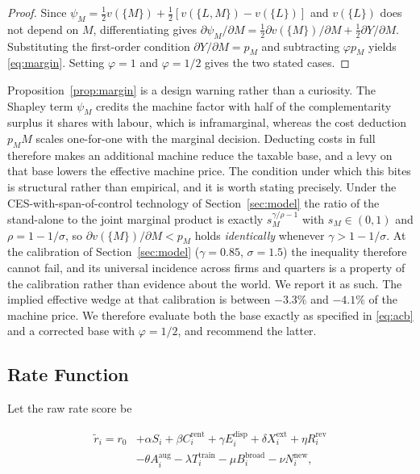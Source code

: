 \documentclass[journal]{IEEEtran}
\theoremstyle{plain}
\theoremstyle{definition}
\begin{document}
\begin{proof}
Since $\psi_M = \tfrac{1}{2}v(\{M\}) + \tfrac{1}{2}[v(\{L,M\}) - v(\{L\})]$ and $v(\{L\})$ does not depend on $M$, differentiating gives $\partial\psi_M/\partial M = \tfrac{1}{2}\partial v(\{M\})/\partial M + \tfrac{1}{2}\partial Y/\partial M$. Substituting the first-order condition $\partial Y/\partial M = p_M$ and subtracting $\varphi p_M$ yields \eqref{eq:margin}. Setting $\varphi = 1$ and $\varphi = 1/2$ gives the two stated cases.
\end{proof}

Proposition~\ref{prop:margin} is a design warning rather than a curiosity. The Shapley term $\psi_M$ credits the machine factor with half of the complementarity surplus it shares with labour, which is inframarginal, whereas the cost deduction $p_M M$ scales one-for-one with the marginal decision. Deducting costs in full therefore makes an additional machine reduce the taxable base, and a levy on that base lowers the effective machine price. The condition under which this bites is structural rather than empirical, and it is worth stating precisely. Under the CES-with-span-of-control technology of Section~\ref{sec:model} the ratio of the stand-alone to the joint marginal product is exactly $s_M^{\gamma/\rho-1}$ with $s_M\in(0,1)$ and $\rho = 1-1/\sigma$, so $\partial v(\{M\})/\partial M < p_M$ holds \emph{identically} whenever $\gamma > 1-1/\sigma$. At the calibration of Section~\ref{sec:model} ($\gamma=0.85$, $\sigma=1.5$) the inequality therefore cannot fail, and its universal incidence across firms and quarters is a property of the calibration rather than evidence about the world. We report it as such. The implied effective wedge at that calibration is between $-3.3\%$ and $-4.1\%$ of the machine price. We therefore evaluate both the base exactly as specified in \eqref{eq:acb} and a corrected base with $\varphi = 1/2$, and recommend the latter.

\subsection{Rate Function}

Let the raw rate score be

\begin{align}
\label{eq:rawrate}
\tilde r_i = r_0 &+ \alpha S_i + \beta C^{\mathrm{rent}}_i + \gamma E^{\mathrm{disp}}_i + \delta X^{\mathrm{ext}}_i + \eta R^{\mathrm{rev}}_i \nonumber\\
&- \theta A^{\mathrm{aug}}_i - \lambda T^{\mathrm{train}}_i - \mu B^{\mathrm{broad}}_i - \nu N^{\mathrm{new}}_i,
\end{align}
\end{document}
